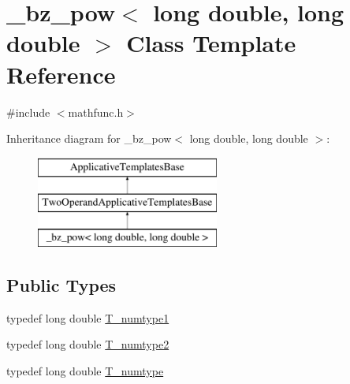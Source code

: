 \hypertarget{class__bz__pow_3_01long_01double_00_01long_01double_01_4}{}\section{\+\_\+bz\+\_\+pow$<$ long double, long double $>$ Class Template Reference}
\label{class__bz__pow_3_01long_01double_00_01long_01double_01_4}


{\ttfamily \#include $<$mathfunc.\+h$>$}

Inheritance diagram for \+\_\+bz\+\_\+pow$<$ long double, long double $>$\+:\begin{figure}[H]
\begin{center}
\leavevmode
\includegraphics[height=3.000000cm]{class__bz__pow_3_01long_01double_00_01long_01double_01_4}
\end{center}
\end{figure}
\subsection*{Public Types}
\begin{DoxyCompactItemize}
\item 
typedef long double \hyperlink{class__bz__pow_3_01long_01double_00_01long_01double_01_4_a08e475617b5ab32a13afb6ff9eb2fd62}{T\+\_\+numtype1}
\item 
typedef long double \hyperlink{class__bz__pow_3_01long_01double_00_01long_01double_01_4_a788ee2955435e2af89084de921be826b}{T\+\_\+numtype2}
\item 
typedef long double \hyperlink{class__bz__pow_3_01long_01double_00_01long_01double_01_4_af5c386bda6a4f5646f01359d28a6bfea}{T\+\_\+numtype}
\end{DoxyCompactItemize}
